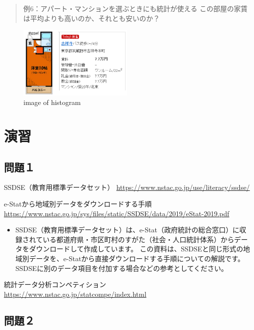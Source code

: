 \documentclass[
]{book}
\providecommand{\tightlist}{%
  \setlength{\itemsep}{0pt}\setlength{\parskip}{0pt}}
\theoremstyle{definition}
\theoremstyle{definition}
\theoremstyle{definition}
\theoremstyle{definition}
\theoremstyle{remark}
\begin{document}
\begin{quote}
例6：アパート・マンションを選ぶときにも統計が使える
この部屋の家賃は平均よりも高いのか、それとも安いのか？
\end{quote}

\begin{figure}
\centering
\includegraphics[width=0.5\textwidth,height=\textheight]{images/lec01/fig_kichi_1room_example.png}
\caption{image of histogram}
\end{figure}

\hypertarget{ux6f14ux7fd2}{%
\section{演習}\label{ux6f14ux7fd2}}

\hypertarget{ux554fux984cuxff11}{%
\subsection{問題１}\label{ux554fux984cuxff11}}

SSDSE（教育用標準データセット）
\url{https://www.nstac.go.jp/use/literacy/ssdse/}

e-Statから地域別データをダウンロードする手順
\url{https://www.nstac.go.jp/sys/files/static/SSDSE/data/2019/eStat-2019.pdf}

\begin{itemize}
\tightlist
\item
  SSDSE（教育用標準データセット）は、e-Stat（政府統計の総合窓口）に収録されている都道府県・市区町村のすがた（社会・人口統計体系）からデータをダウンロードして作成しています。
  この資料は、SSDSEと同じ形式の地域別データを、e-Statから直接ダウンロードする手順についての解説です。SSDSEに別のデータ項目を付加する場合などの参考としてください。
\end{itemize}

統計データ分析コンペティション
\url{https://www.nstac.go.jp/statcompe/index.html}

\hypertarget{ux554fux984cuxff12}{%
\subsection{問題２}\label{ux554fux984cuxff12}}
\end{document}
